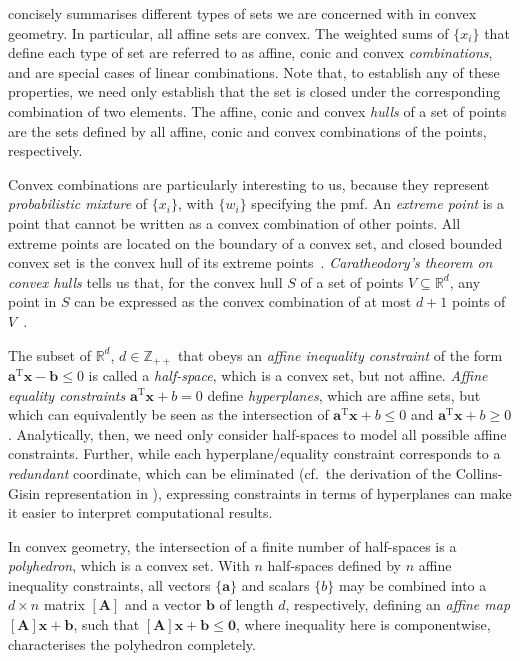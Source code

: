 \documentclass[10pt, a4paper]{article}
\numberwithin{equation}{section} %
\theoremstyle{definition}
\theoremstyle{plain}
\newcommand{\?}{\mathrel{?}} %
\newcommand{\Z}{\mathbb{Z}} %
\newcommand{\R}{\mathbb{R}} %
\newcommand{\tpose}{\mathrm{T}}
\newcommand{\cvec}[1]{\boldsymbol{\mathbf{#1}}}    %
\newcommand{\rvec}[1]{\boldsymbol{\mathbf{#1}}^\tpose} %
\newcommand{\matr}[2][]{\left[\mathbf{#2}#1\right]} %
\begin{document}
\begin{appendices}
                     concisely summarises different types of sets we are concerned with in convex geometry. In particular, all affine sets are convex. The weighted sums of \(\{x_i\}\) that define each type of set are referred to as affine, conic and convex \emph{combinations}, and are special cases of linear combinations. Note that, to establish any of these properties, we need only establish that the set is closed under the corresponding combination of two elements. The affine, conic and convex \emph{hulls} of a set of points are the sets defined by all affine, conic and convex combinations of the points, respectively.

                    Convex combinations are particularly interesting to us, because they represent \emph{probabilistic mixture} of \(\{x_i\}\), with \(\{w_i\}\) specifying the pmf. An \emph{extreme point} is a point that cannot be written as a convex combination of other points. All extreme points are located on the boundary of a convex set, and closed bounded convex set is the convex hull of its extreme points~\cite[Ch. B.4]{LuenbergerYe}. \emph{Caratheodory's theorem on convex hulls} tells us that, for the convex hull \(S\) of a set of points \(V \subseteq \R^{d}\), any point in \(S\) can be expressed as the convex combination of at most \(d+1\) points of \(V\)~\cite{Caratheodory,CaratheodorySteinitz}.

                    The subset of \(\R^d\), \(d \in \Z_{++}\) that obeys an \emph{affine inequality constraint} of the form \(\rvec{a}\cvec{x} - \cvec{b} \leq 0\) is called a \emph{half-space}, which is a convex set, but not affine. \emph{Affine equality constraints} \(\rvec{a}\cvec{x} + b = 0\) define \emph{hyperplanes}, which are affine sets, but which can equivalently be seen as the intersection of \(\rvec{a}\cvec{x} + b \leq 0\) and \(\rvec{a}\cvec{x} + b \geq 0\). Analytically, then, we need only consider half-spaces to model all possible affine constraints. Further, while each hyperplane/equality constraint corresponds to a \emph{redundant} coordinate, which can be eliminated (cf.\ the derivation of the Collins-Gisin representation in ), expressing constraints in terms of hyperplanes can make it easier to interpret computational results.

                    In convex geometry, the intersection of a finite number of half-spaces is a \emph{polyhedron}, which is a convex set. With \(n\) half-spaces defined by \(n\) affine inequality constraints, all vectors \(\{\cvec{a}\}\) and scalars \(\{b\}\) may be combined into a \(d\times{n}\) matrix \(\matr{A}\) and a vector \(\cvec{b}\) of length \(d\), respectively, defining an \emph{affine map} \(\matr{A}\cvec{x} + \cvec{b}\), such that \(\matr{A}\cvec{x} + \cvec{b} \leq \cvec{0}\), where inequality here is componentwise, characterises the polyhedron completely.


\end{appendices}
\end{document}
